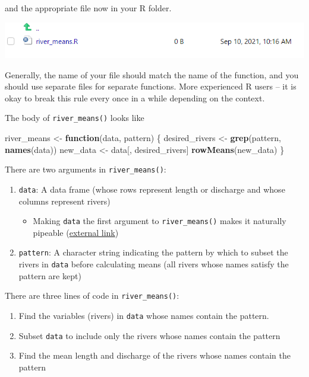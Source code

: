 \documentclass[
]{book}
\newenvironment{Shaded}{\begin{snugshade}}{\end{snugshade}}
\newcommand{\ControlFlowTok}[1]{\textcolor[rgb]{0.13,0.29,0.53}{\textbf{#1}}}
\newcommand{\KeywordTok}[1]{\textcolor[rgb]{0.13,0.29,0.53}{\textbf{#1}}}
\newcommand{\NormalTok}[1]{#1}
\newcommand{\StringTok}[1]{\textcolor[rgb]{0.31,0.60,0.02}{#1}}
\providecommand{\tightlist}{%
  \setlength{\itemsep}{0pt}\setlength{\parskip}{0pt}}
\begin{document}
and the appropriate file now in your R folder.

\includegraphics[width=1\linewidth]{images/newrpack_function}

Generally, the name of your file should match the name of the function, and you should use separate files for separate functions. More experienced R users -- it is okay to break this rule every once in a while depending on the context.

The body of \texttt{river\_means()} looks like

\begin{Shaded}
\begin{Highlighting}[]
\NormalTok{river_means <-}\StringTok{ }\ControlFlowTok{function}\NormalTok{(data, pattern) \{}
\NormalTok{  desired_rivers <-}\StringTok{ }\KeywordTok{grep}\NormalTok{(pattern, }\KeywordTok{names}\NormalTok{(data))}
\NormalTok{  new_data <-}\StringTok{ }\NormalTok{data[, desired_rivers]}
  \KeywordTok{rowMeans}\NormalTok{(new_data)}
\NormalTok{\}}
\end{Highlighting}
\end{Shaded}

There are two arguments in \texttt{river\_means()}:

\begin{enumerate}
\def\labelenumi{\arabic{enumi}.}
\tightlist
\item
  \texttt{data}: A data frame (whose rows represent length or discharge and whose columns represent rivers)

  \begin{itemize}
  \tightlist
  \item
    Making \texttt{data} the first argument to \texttt{river\_means()} makes it naturally pipeable (\href{https://r4ds.had.co.nz/pipes.html}{external link})
  \end{itemize}
\item
  \texttt{pattern}: A character string indicating the pattern by which to subset the rivers in \texttt{data} before calculating means (all rivers whose names satisfy the pattern are kept)
\end{enumerate}

There are three lines of code in \texttt{river\_means()}:

\begin{enumerate}
\def\labelenumi{\arabic{enumi}.}
\tightlist
\item
  Find the variables (rivers) in \texttt{data} whose names contain the pattern.
\item
  Subset \texttt{data} to include only the rivers whose names contain the pattern
\item
  Find the mean length and discharge of the rivers whose names contain the pattern
\end{enumerate}
\end{document}
